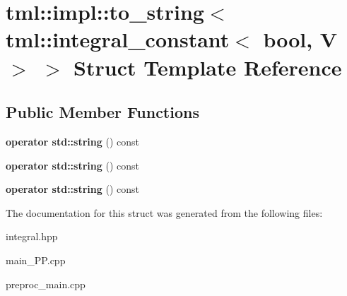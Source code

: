 \hypertarget{structtml_1_1impl_1_1to__string_3_01tml_1_1integral__constant_3_01bool_00_01V_01_4_01_4}{\section{tml\+:\+:impl\+:\+:to\+\_\+string$<$ tml\+:\+:integral\+\_\+constant$<$ bool, V $>$ $>$ Struct Template Reference}
\label{structtml_1_1impl_1_1to__string_3_01tml_1_1integral__constant_3_01bool_00_01V_01_4_01_4}
}
\subsection*{Public Member Functions}
\begin{DoxyCompactItemize}
\item 
\hypertarget{structtml_1_1impl_1_1to__string_3_01tml_1_1integral__constant_3_01bool_00_01V_01_4_01_4_ac091de75d83cfc5d18538d07a5634d39}{{\bfseries operator std\+::string} () const }\label{structtml_1_1impl_1_1to__string_3_01tml_1_1integral__constant_3_01bool_00_01V_01_4_01_4_ac091de75d83cfc5d18538d07a5634d39}

\item 
\hypertarget{structtml_1_1impl_1_1to__string_3_01tml_1_1integral__constant_3_01bool_00_01V_01_4_01_4_ac091de75d83cfc5d18538d07a5634d39}{{\bfseries operator std\+::string} () const }\label{structtml_1_1impl_1_1to__string_3_01tml_1_1integral__constant_3_01bool_00_01V_01_4_01_4_ac091de75d83cfc5d18538d07a5634d39}

\item 
\hypertarget{structtml_1_1impl_1_1to__string_3_01tml_1_1integral__constant_3_01bool_00_01V_01_4_01_4_ac091de75d83cfc5d18538d07a5634d39}{{\bfseries operator std\+::string} () const }\label{structtml_1_1impl_1_1to__string_3_01tml_1_1integral__constant_3_01bool_00_01V_01_4_01_4_ac091de75d83cfc5d18538d07a5634d39}

\end{DoxyCompactItemize}


The documentation for this struct was generated from the following files\+:\begin{DoxyCompactItemize}
\item 
integral.\+hpp\item 
main\+\_\+\+P\+P.\+cpp\item 
preproc\+\_\+main.\+cpp\end{DoxyCompactItemize}
